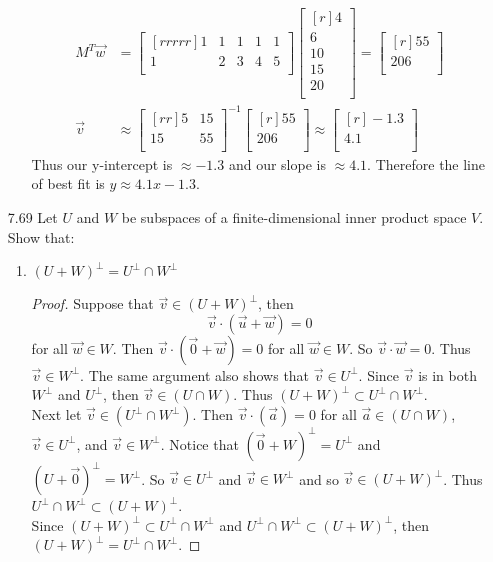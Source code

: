 \documentclass[12pt]{article}
\theoremstyle{definition}
\theoremstyle{plain}
\begin{document}
\begin{enumerate}
\begin{enumerate}
\begin{align*}
		M^T\vec{w}&=\begin{bmatrix}[rrrrr]1&1&1&1&1\\1&2&3&4&5\\\end{bmatrix}\begin{bmatrix}[r]4\\6\\10\\15\\20\\\end{bmatrix} = \begin{bmatrix}[r]55\\206\\\end{bmatrix}\\
		\vec{v}&\approx \begin{bmatrix}[rr]5&15\\15&55\\\end{bmatrix}^{-1}\begin{bmatrix}[r]55\\206\\\end{bmatrix} \approx \begin{bmatrix}[r]-1.3\\4.1\\\end{bmatrix}
		\end{align*}
		Thus our y-intercept is $\approx -1.3$ and our slope is $\approx 4.1$. Therefore the line of best fit is $y \approx 4.1x-1.3$.
	\end{enumerate}

\item[7.69]Let $U$ and $W$ be subspaces of a finite-dimensional inner product space $V$. Show that:
	\begin{enumerate}
	\item $(U+W)^\perp = U^\perp \cap W^\perp$
	\begin{proof}
	Suppose that $\vec{v}\in(U+W)^\perp$, then
	\[ \vec{v}\cdot (\vec{u}+\vec{w})=0\]
	for all $\vec{w}\in W$. Then $\vec{v}\cdot (\vec{0}+\vec{w})=0$ for all $\vec{w}\in W$. So $\vec{v}\cdot \vec{w} = 0$. Thus $\vec{v}\in W^\perp$. The same argument also shows that $\vec{v}\in U^\perp$. Since $\vec{v}$ is in both $W^\perp$ and $U^\perp$, then $\vec{v}\in (U \cap W)$. Thus $(U+W)^\perp \subset U^\perp \cap W^\perp$.\\
	Next let $\vec{v}\in (U^\perp \cap W^\perp )$. Then $\vec{v}\cdot (\vec{a}) = 0$ for all $\vec{a}\in (U\cap W)$, $\vec{v}\in U^\perp$, and $\vec{v}\in W^\perp$. Notice that $(\vec{0}+W)^\perp = U^\perp$ and $(U+\vec{0})^\perp = W^\perp$. So $\vec{v}\in U^\perp$ and $\vec{v}\in W^\perp$ and so $\vec{v}\in (U+W)^\perp$. Thus $U^\perp \cap W^\perp \subset (U+W)^\perp$.\\
	Since $(U+W)^\perp \subset U^\perp \cap W^\perp$ and $U^\perp \cap W^\perp \subset (U+W)^\perp$, then $(U+W)^\perp = U^\perp \cap W^\perp$.
	\end{proof}
	\end{enumerate}


\end{enumerate}
\end{document}
